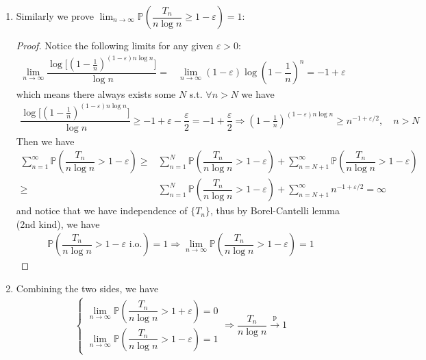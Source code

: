 \documentclass[11pt,a4paper]{article}
\numberwithin{equation}{section}%
\begin{document}
\begin{enumerate}[topsep=2pt,itemsep=2pt]
        \item Similarly we prove $ \displaystyle \lim_{n\to\infty} \mathbb{P}\left( \dfrac{ T_n  }{ n\log n } \mathop{ \geq  } 1-\varepsilon   \right) =1 $:
        \begin{proof}
            Notice the following limits for any given $ \varepsilon  >0 $:
            \begin{align*}
                 \lim_{n\to\infty } \dfrac{ \log \big[ (1-\frac{1}{n})^{(1-\varepsilon  )n\log n} \big] }{ \log n } =& \lim_{n\to\infty } (1-\varepsilon  )\log \left( 1-\dfrac{ 1 }{ n }  \right)^n = -1+\varepsilon 
            \end{align*}
            which means there always exists some $ N $ s.t. $ \forall n>N $ we have
        \begin{align*}
            \dfrac{ \log \big[ (1-\frac{1}{n})^{(1-\varepsilon  )n\log n} \big] }{ \log n } \geq -1+\varepsilon - \dfrac{ \varepsilon  }{ 2 } = -1 + \dfrac{ \varepsilon  }{ 2 } \Rightarrow (1-\frac{1}{n})^{(1-\varepsilon  )n\log n} \geq n^{-1+\varepsilon /2} ,\quad  n>N
        \end{align*}
        Then we have 
        \begin{align*}
            \sum_{n=1}^\infty \mathbb{P}\left( \dfrac{ T_n }{ n\log n } > 1-\varepsilon  \right) \geq & \sum_{n=1}^N \mathbb{P}\left( \dfrac{ T_n }{ n\log n } > 1-\varepsilon  \right) + \sum_{n=N+1}^\infty \mathbb{P}\left( \dfrac{ T_n }{ n\log n } > 1-\varepsilon  \right) \\
            \geq & \sum_{n=1}^N \mathbb{P}\left( \dfrac{ T_n }{ n\log n } > 1-\varepsilon  \right) + \sum_{n=N+1}^\infty n^{-1+\varepsilon /2} = \infty
        \end{align*}
        and notice that we have independence of $ \{T_n\} $, thus by Borel-Cantelli lemma (2nd kind), we have
        \begin{align*}
            \mathbb{P}\left( \dfrac{ T_n }{ n\log n } > 1-\varepsilon  \text{ i.o.} \right) = 1  \Rightarrow \lim_{n\to\infty} \mathbb{P}\left( \dfrac{ T_n }{ n\log n } > 1-\varepsilon  \right) = 1
        \end{align*}    
            
        \end{proof}
        
        \item Combining the two sides, we have
            \begin{align*}
                \begin{cases}
                    \lim_{n\to\infty} \mathbb{P}\left( \dfrac{ T_n }{ n\log n } > 1+\varepsilon   \right) = 0\\
                    \lim_{n\to\infty} \mathbb{P}\left( \dfrac{ T_n }{ n\log n } > 1-\varepsilon   \right) = 1
                \end{cases}  \Rightarrow \dfrac{ T_n }{ n\log n }\xrightarrow[]{\mathrm{p}} 1 
            \end{align*}

\end{enumerate}
\end{document}
